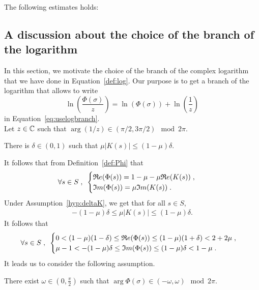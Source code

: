 \documentclass[11pt]{amsart}
\renewcommand{\Re}{\mathfrak{R}e}
\renewcommand{\Im}{\mathfrak{I}m}
\begin{document}
\begin{lemma} The following estimates holds:
\end{lemma}


\subsection{A discussion about the choice of the branch of the logarithm}
In this section, we motivate the choice of the branch of the complex logarithm that we have done in Equation~\eqref{def:log}. Our purpose is to get a branch of the logarithm that allows to write 
    $$ \ln(\frac{\Phi(\sigma)}{z}) = \ln(\Phi(\sigma)) + \ln(\frac{1}{z})$$
in Equation~\eqref{eq:uselogbranch}. \\

Let $z \in \mathbb{C}$ such that $\arg(1/z) \in (\pi/2, 3\pi/2) \mod 2\pi$.
\begin{hypothesis}
    There is $\delta \in (0,1)$ such that $ \mu |K(s)| \leq (1-\mu)\delta$.
    \label{hyp:deltaK}
\end{hypothesis}
It follows that from Definition~\eqref{def:Phi} that 
$$\forall s \in S \eqsepv 
\begin{cases}
    \Re(\Phi(s)) = 1-\mu-\mu \Re(K(s))\eqsepv \\
    \Im(\Phi(s)) = \mu \Im(K(s))\eqfinp
\end{cases}
$$
Under Assumption~\ref{hyp:deltaK}, we get that for all $s \in S$, 
    \begin{align*}
     -(1-\mu)\delta \leq \mu |K(s)| \leq (1-\mu)\delta.
    \end{align*}
It follows that
$$\forall s \in S \eqsepv 
\begin{cases}
    0 < (1-\mu)(1-\delta) \leq \Re(\Phi(s)) \leq (1-\mu)(1+\delta) < 2 + 2\mu \eqfinv
    \\ 
   \mu-1 < -(1-\mu) \delta \leq \Im(\Phi(s)) \leq (1-\mu) \delta < 1-\mu \eqfinp
\end{cases}
$$
It leads us to consider the following assumption.
\begin{hypothesis}
There exist $\omega \in \left(0, \frac\pi2 \right)$ such that $\arg\Phi(\sigma) \in (-\omega, \omega) \mod 2\pi$.   
\end{hypothesis}
\end{document}
